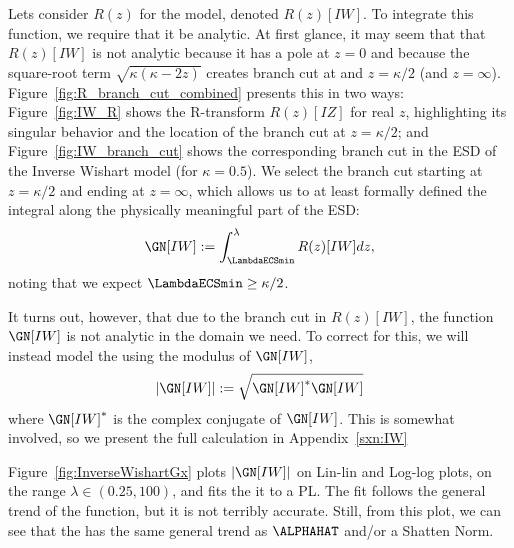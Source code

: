 Lets consider $R(z)$ for the \InverseWishart model, denoted $R(z)[IW]$.
To integrate this function, we require that it be analytic.
At first glance, it may seem that that $R(z)[IW]$ is not analytic because it
has a pole at $z=0$ and because the square-root term $\sqrt{\kappa(\kappa-2z)}$  creates branch
cut at and $z=\kappa/2$ (and $z=\infty$).
Figure~\ref{fig:R_branch_cut_combined} presents this in two ways:
Figure~\ref{fig:IW_R} shows the R-transform $R(z)[IZ]$ for real $z$, highlighting its singular behavior and the location of the branch cut at $z = \kappa/2$; and
Figure~\ref{fig:IW_branch_cut} shows the corresponding branch cut in the ESD of the Inverse Wishart model (for $\kappa = 0.5$).
We select the branch cut starting at $z=\kappa/2$ and ending at $z=\infty$,
which allows us to at least formally defined the integral along the physically meaningful part of the ESD:
\begin{equation}
\label{eqn:IW_model_1} 
\GN[IW] := \int_{\LambdaECSmin}^{\lambda} R(z)[IW] dz  ,
\end{equation}
noting that we expect $\LambdaECSmin\ge\kappa/2$.

It turns out, however, that due to the branch cut in $R(z)[IW]$,
the function $\GN[IW]$ is not analytic in the domain we need. 
To correct for this, we will instead model the \LayerQualitySquared using the modulus of $\GN[IW]$,
\begin{equation}
\label{eqn:IW_model_1} 
|\GN[IW]| := \sqrt{\GN[IW]^{*}\GN[IW]}
\end{equation}
where $\GN[IW]^{*}$ is the complex conjugate of $\GN[IW]$.
This is somewhat involved, so we present the full calculation in Appendix~\ref{sxn:IW}


Figure~\ref{fig:InverseWishartGx} plots $|\GN[IW]|$ on Lin-lin and Log-log plots, on the range $\lambda\in(0.25, 100)$, and fits the it to a PL. 
The fit follows the general trend of the function, but it is not terribly accurate.
Still, from this plot, we can see that the \LayerQualitySquared has the same general trend as $\ALPHAHAT$ and/or a Shatten Norm.

